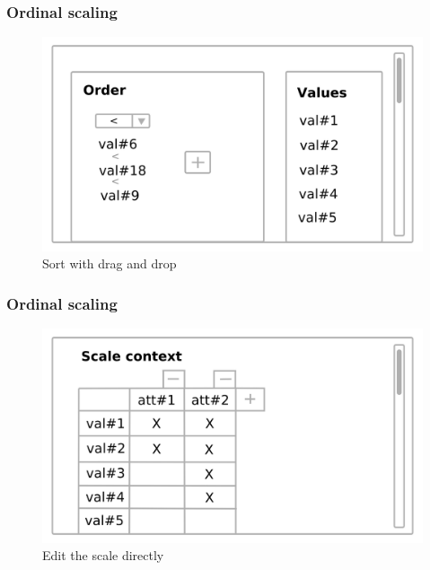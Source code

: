 \documentclass[]{beamer}
\begin{document}
	\begin{frame}
		\frametitle{Ordinal scaling}
		\begin{figure}[H]
			\includegraphics[width=\linewidth]{../mock_up/ord-2.png}
			\caption{Sort with drag and drop}
			\label{fig:p1}
		\end{figure}
	\end{frame}

	\begin{frame}
		\frametitle{Ordinal scaling}
		\begin{figure}[H]
			\includegraphics[width=\linewidth]{../mock_up/ord-1.png}
			\caption{Edit the scale directly}
			\label{fig:p1}
		\end{figure}
	\end{frame}
\end{document}
